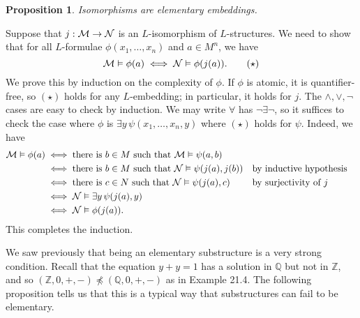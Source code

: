 \documentclass[10pt]{article}
\makeatletter
\newcommand{\Z}{\mathbb{Z}}
\newcommand{\Q}{\mathbb{Q}}
\theoremstyle{newstyle}
\newtheorem{prop}[thm]{Proposition}
\newenvironment{pf}[1][\proofname]{\par
  \pushQED{\qed}%
  \normalfont \topsep0\p@\relax
  \trivlist
  \item[\hskip\labelsep\scshape
  #1\@addpunct{.}]\ignorespaces
}{%
  \popQED\endtrivlist\@endpefalse
}
\makeatother
\begin{document}
\begin{prop}
Isomorphisms are elementary embeddings.
\end{prop}
\begin{pf}
Suppose that $j : {\cal M \to N}$ is an $L$-isomorphism of $L$-structures. We need to show that 
for all $L$-formulae $\phi(x_1, \dots, x_n)$ and $a \in M^n$, we have 
\[ {\cal M} \vDash \phi(a) \iff {\cal N} \vDash \phi(j(a)). \tag{$\star$} \]
We prove this by induction on the complexity of $\phi$. If $\phi$ is atomic, it is 
quantifier-free, so $(\star)$ holds for any $L$-embedding; in particular, 
it holds for $j$. The $\wedge, \vee, \neg$ 
cases are easy to check by induction. We may write $\forall$ has $\neg \exists \neg$, 
so it suffices to check the case where $\phi$ is $\exists y \, \psi(x_1, \dots, x_n, y)$ 
where $(\star)$ holds for $\psi$. Indeed, we have 
\begin{align*}
    {\cal M} \vDash \phi(a) &\iff \text{there is $b \in M$ such that ${\cal M} \vDash \psi(a, b)$} \\
    &\iff \text{there is $b \in M$ such that ${\cal N} \vDash \psi(j(a), j(b))$} && \text{by inductive hypothesis} \\ 
    &\iff \text{there is $c \in N$ such that ${\cal N} \vDash \psi(j(a), c)$} && \text{by surjectivity of $j$} \\
    &\iff {\cal N} \vDash \exists y \, \psi(j(a), y) \\
    &\iff {\cal N} \vDash \phi(j(a)).
\end{align*}
This completes the induction.
\end{pf}

We saw previously that being an elementary substructure is a very strong condition. 
Recall that the equation $y + y = 1$ has a solution in $\Q$ but not in $\Z$, 
and so $(\Z, 0, +, -) \npreceq (\Q, 0, +, -)$ as in Example 21.4.
The following proposition tells us that this is a typical way that substructures can fail to 
be elementary. 
\end{document}
